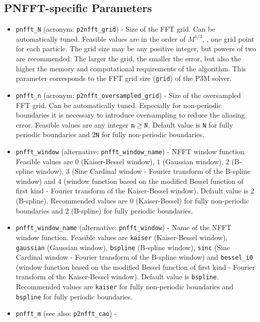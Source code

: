 \subsection{PNFFT-specific Parameters}
\begin{itemize}
  \item \verb!pnfft_N! (acronym: \verb!p2nfft_grid!) -
    Size of the FFT grid. Can be automatically tuned.
    Feasible values are in the order of $M^{1/3}$, \ie, one
    grid point for each particle. The grid size may be any positive integer, but powers of
    two are recommended. The larger the grid, the smaller the
    error, but also the higher the memory and computational requirements
    of the algorithm.
    This parameter corresponds to the FFT grid size (\verb!grid!) of the P3M solver.
  \item \verb!pnfft_n! (acronym: \verb!p2nfft_oversampled_grid!) -
    Size of the oversampled FFT grid. Can be automatically tuned.
    Especially for non-periodic boundaries it is necessary to introduce oversampling to reduce the aliasing error.
    Feasible values are any integer $\verb!n! \ge \verb!N!$. Default value is
    \verb!N! for fully periodic boundaries and 2\verb!N! for fully non-periodic
    boundaries.
  \item \verb!pnfft_window! (alternative: \verb!pnfft_window_name!) -
    NFFT window function. Feasible values are $0$ (Kaiser-Bessel window), $1$ (Gaussian window),
    $2$ (B-spline window), $3$ (Sine Cardinal window - Fourier transform of the B-spline window) and $4$
    (window function based on the modified Bessel function of first kind - Fourier transform of the Kaiser-Bessel window).
    Default value is $2$ (B-spline). Recommended values are $0$ (Kaiser-Bessel) for fully non-periodic boundaries and $2$ (B-spline) for fully periodic boundaries.
  \item \verb!pnfft_window_name! (alternative: \verb!pnfft_window!) -
    Name of the NFFT window function. Feasible values are \verb!kaiser! (Kaiser-Bessel window), \verb!gaussian! (Gaussian window),
    \verb!bspline! (B-spline window), \verb!sinc! (Sine Cardinal window - Fourier transform of the B-spline window) and \verb!bessel_i0!
    (window function based on the modified Bessel function of first kind - Fourier transform of the Kaiser-Bessel window).
    Default value is \verb!bspline!. Recommended values are \verb!kaiser! for fully non-periodic boundaries and \verb!bspline! for fully periodic boundaries.
  \item \verb!pnfft_m! (see also: \verb!p2nfft_cao!) -

\end{itemize}
